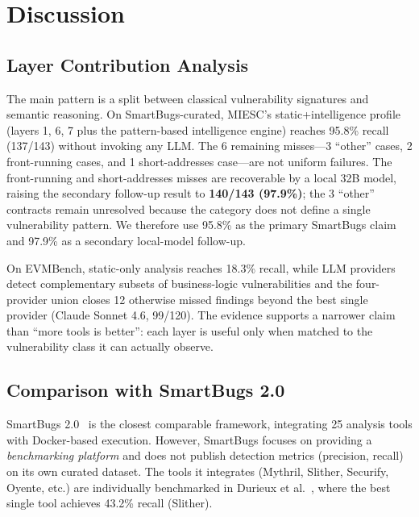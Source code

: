 \documentclass[conference]{IEEEtran}
\begin{document}
\section{Discussion}

\subsection{Layer Contribution Analysis}

The main pattern is a split between classical vulnerability signatures and semantic reasoning. On SmartBugs-curated, MIESC's static+intelligence profile (layers 1, 6, 7 plus the pattern-based intelligence engine) reaches 95.8\% recall (137/143) without invoking any LLM. The 6 remaining misses---3 ``other'' cases, 2 front-running cases, and 1 short-addresses case---are not uniform failures. The front-running and short-addresses misses are recoverable by a local 32B model, raising the secondary follow-up result to \textbf{140/143 (97.9\%)}; the 3 ``other'' contracts remain unresolved because the category does not define a single vulnerability pattern. We therefore use 95.8\% as the primary SmartBugs claim and 97.9\% as a secondary local-model follow-up.

On EVMBench, static-only analysis reaches 18.3\% recall, while LLM providers detect complementary subsets of business-logic vulnerabilities and the four-provider union closes 12 otherwise missed findings beyond the best single provider (Claude Sonnet 4.6, 99/120). The evidence supports a narrower claim than ``more tools is better'': each layer is useful only when matched to the vulnerability class it can actually observe.

\subsection{Comparison with SmartBugs 2.0}

SmartBugs 2.0~\cite{smartbugs2023} is the closest comparable framework, integrating 25 analysis tools with Docker-based execution. However, SmartBugs focuses on providing a \emph{benchmarking platform} and does not publish detection metrics (precision, recall) on its own curated dataset. The tools it integrates (Mythril, Slither, Securify, Oyente, etc.) are individually benchmarked in Durieux et al.~\cite{durieux2020empirical}, where the best single tool achieves 43.2\% recall (Slither).
\end{document}
